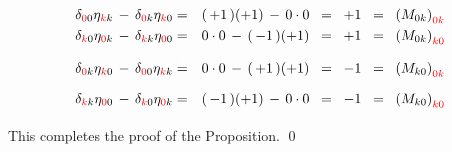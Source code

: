 \begin{enumerate}
	\begin{eqnarray*}
	\delta_{{\color{red}0}0}\eta_{{\color{red}k}k}
	\,-\,
	\delta_{{\color{red}0}k}\eta_{{\color{red}k}0}
	& = &
		(\,+1\,)(+1) \,-\, 0 \cdot 0
	\;\; = \;\;
		+1
	\;\; = \;\;
		\left(M_{0k}\right)_{{\color{red}0k}}
	\\
	\delta_{{\color{red}k}0}\eta_{{\color{red}0}k}
	\,-\,
	\delta_{{\color{red}k}k}\eta_{{\color{red}0}0}
	& = &
		0 \cdot 0 \,-\, (\,-1\,)(+1)
	\;\; = \;\;
		+1
	\;\; = \;\;
		\left(M_{0k}\right)_{{\color{red}k0}}
	\\
	\delta_{{\color{red}0}k}\eta_{{\color{red}k}0}
	\,-\,
	\delta_{{\color{red}0}0}\eta_{{\color{red}k}k}
	& \overset{{\color{white}\textnormal{\Large$1$}}}{=} &
		0 \cdot 0 \,-\, (\,+1\,)(+1)
	\;\; = \;\;
		-1
	\;\; = \;\;
		\left(M_{k0}\right)_{{\color{red}0k}}
	\\
	\delta_{{\color{red}k}k}\eta_{{\color{red}0}0}
	\,-\,
	\delta_{{\color{red}k}0}\eta_{{\color{red}0}k}
	& = &
		(\,-1\,)(+1) \,-\, 0 \cdot 0
	\;\; = \;\;
		-1
	\;\; = \;\;
		\left(M_{k0}\right)_{{\color{red}k0}}
	\end{eqnarray*}
\end{enumerate}
This completes the proof of the Proposition.
\qed

